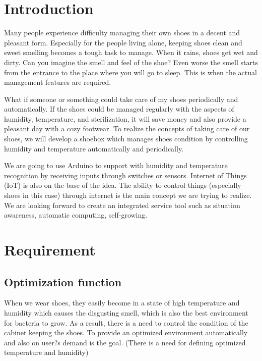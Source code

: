 \documentclass[conference]{IEEEtran}
\begin{document}
\section{Introduction}
Many people experience difficulty managing their own shoes in a decent and pleasant form. Especially for the people living alone, keeping shoes clean and sweet smelling becomes a tough task to manage. When it rains, shoes get wet and dirty. Can you imagine the smell and feel of the shoe? Even worse the smell starts from the entrance to the place where you will go to sleep. This is when the actual management features are required.

What if someone or something could take care of my shoes periodically and automatically. If the shoes could be managed regularly with the aspects of humidity, temperature, and sterilization, it will save money and also provide a pleasant day with a cozy footwear. To realize the concepts of taking care of our shoes, we will develop a shoebox which manages shoes condition by controlling humidity and temperature automatically and periodically. 

We are going to use Arduino to support with humidity and temperature recognition by receiving inputs through switches or sensors. Internet of Things (IoT) is also on the base of the idea. The ability to control things (especially shoes in this case) through internet is the main concept we are trying to realize. We are looking forward to create an integrated service tool such as situation awareness, automatic computing, self-growing. \\


\section{Requirement}

\subsection{Optimization function}
When we wear shoes, they easily become in a state of high temperature and humidity which causes the disgusting smell, which is also the best environment for bacteria to grow. As a result, there is a need to control the condition of the cabinet keeping the shoes. To provide an optimized environment automatically and also on user?s demand is the goal. (There is a need for defining optimized temperature and humidity)
\end{document}
